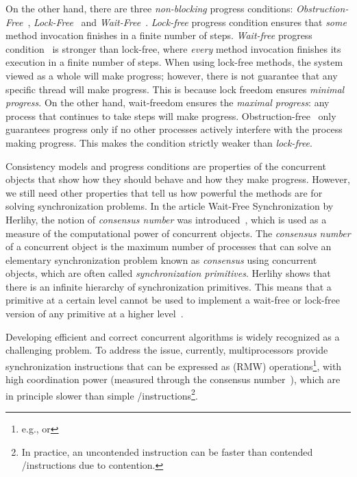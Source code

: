 On the other hand, there are three \textit{non-blocking} progress conditions: \textit{Obstruction-Free}~\cite{DBLP_conf_icdcs_HerlihyLM03}, \textit{Lock-Free}~\cite{DBLP_journals_toplas_HerlihyW90} and \textit{Wait-Free}~\cite{DBLP_journals_toplas_Herlihy91}.
\textit{Lock-free} progress condition ensures that \textit{some} method invocation finishes in a finite number of steps. \textit{Wait-free} progress condition~\cite{DBLP_journals_toplas_Herlihy91} is stronger than lock-free, where \textit{every} method invocation finishes its execution in a finite number of steps. When using lock-free methods, the system viewed as a whole will make progress; however, there is not guarantee that any specific thread will make progress. This is because lock freedom ensures \textit{minimal progress}. On the other hand, wait-freedom ensures the \textit{maximal progress}: any process that continues to take steps will make progress. Obstruction-free~\cite{DBLP_conf_icdcs_HerlihyLM03} only guarantees progress only if no other processes actively interfere with the process making progress. This makes the condition strictly weaker than \textit{lock-free}. %

Consistency models and progress conditions are properties of the concurrent objects that show how they should behave and how they make progress. However, we still need other properties that tell us how powerful the methods are for solving synchronization problems. In the article Wait-Free Synchronization by Herlihy, the notion of \textit{consensus number} was introduced~\cite{DBLP_journals_toplas_Herlihy91}, which is used as a measure of the computational power of concurrent objects. The \textit{consensus number} of a concurrent object is the maximum number of processes that can solve an elementary synchronization problem known as \textit{consensus} using concurrent objects, which are often called \textit{synchronization primitives}. Herlihy shows that there is an infinite hierarchy of synchronization primitives. This means that a primitive at a certain level cannot be used to implement a wait-free or lock-free version of any primitive at a higher level~\cite{DBLP_journals_toplas_Herlihy91}.

Developing efficient and correct concurrent algorithms is widely recognized as a challenging problem. To address the issue, currently, multiprocessors provide synchronization instructions that can be expressed as \RMW (RMW) operations\footnote{e.g., \CAS or \TAS}, with high coordination power (measured through the consensus number~\cite{DBLP_journals_toplas_Herlihy91}), which are in principle slower than simple \R/\W instructions\footnote{In practice, an uncontended \RMW instruction can be faster than contended \R/\W instructions due to contention.}.

